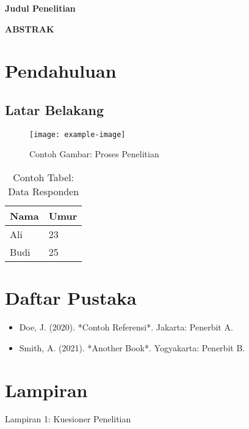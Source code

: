 \documentclass[12pt]{article}
\begin{document}
\begin{center}
    \textbf{\LARGE Judul Penelitian}
\end{center}

\begin{center}
    \textbf{\large ABSTRAK}
\end{center}
\singlespacing
\noindent
\fontsize{12pt}{14pt}\selectfont
\lipsum[1]

\vspace{1cm}
\onehalfspacing

\renewcommand{\cftsecleader}{\cftdotfill{\cftdotsep}}
\singlespacing
\tableofcontents
\onehalfspacing
\newpage

\section{Pendahuluan}
\lipsum[2-3]

\subsection{Latar Belakang}
\lipsum[4]

\begin{figure}[H]
    \centering
    \texttt{[image: example-image]}
    \caption{\textnormal{{Contoh Gambar: Proses Penelitian}}}
\end{figure}

\begin{table}[H]
    \centering
    \caption{\textnormal{{Contoh Tabel: Data Responden}}}
    \begin{tabular}{ll}
        \toprule
        Nama & Umur \\
        \midrule
        Ali & 23 \\
        Budi & 25 \\
        \bottomrule
    \end{tabular}
\end{table}

\newpage
\singlespacing
\section*{Daftar Pustaka}
\begin{itemize}
    \item Doe, J. (2020). *Contoh Referensi*. Jakarta: Penerbit A.
    \item Smith, A. (2021). *Another Book*. Yogyakarta: Penerbit B.
\end{itemize}

\newpage
\section*{Lampiran}
\singlespacing
\noindent Lampiran 1: Kuesioner Penelitian
\end{document}
